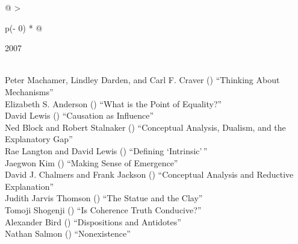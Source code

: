 \documentclass[
  10pt,
  letterpaper,
  DIV=11,
  numbers=noendperiod,
  twoside]{scrartcl}
\begin{document}
\begin{longtable}[]{@{}
  >{\raggedright\arraybackslash}p{(\columnwidth - 0\tabcolsep) * }@{}}

\caption{\label{tbl-top-ten-1998}Most cited articles published less than
ten years ago as of 2007.}

\tabularnewline

\toprule\noalign{}
\begin{minipage}[b]{\linewidth}\raggedright
2007
\end{minipage} \\
\midrule\noalign{}
\endhead
\bottomrule\noalign{}
\endlastfoot
Peter Machamer, Lindley Darden, and Carl F. Craver
()
``Thinking About Mechanisms'' \\
Elizabeth S. Anderson
()
``What is the Point of Equality?'' \\
David Lewis
()
``Causation as Influence'' \\
Ned Block and Robert Stalnaker
()
``Conceptual Analysis, Dualism, and the Explanatory Gap'' \\
Rae Langton and David Lewis
()
``Defining `Intrinsic'\,'' \\
Jaegwon Kim
()
``Making Sense of Emergence'' \\
David J. Chalmers and Frank Jackson
()
``Conceptual Analysis and Reductive Explanation'' \\
Judith Jarvis Thomson
()
``The Statue and the Clay'' \\
Tomoji Shogenji
()
``Is Coherence Truth Conducive?'' \\
Alexander Bird
()
``Dispositions and Antidotes'' \\
Nathan Salmon
()
``Nonexistence'' \\

\end{longtable}
\end{document}
